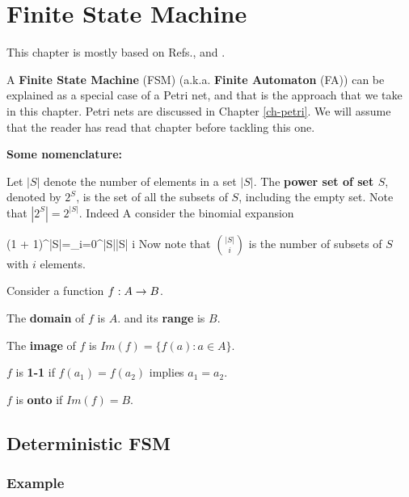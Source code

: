 \chapter{Finite State Machine}
\label{ch-finite-state}

This chapter is mostly based on Refs.\cite{fsm-brilliant}, \cite{wiki-det-automaton} and
\cite{wiki-nondet-automaton}.

A {\bf Finite State Machine} (FSM) (a.k.a. {\bf Finite Automaton} (FA))  can be explained as a 
special case of a Petri net, and that
is the approach that we take in this chapter.
Petri nets are discussed in Chapter \ref{ch-petri}. We will assume
that the reader has read that chapter before tackling this one.

{\bf Some nomenclature:}

Let $|S|$ denote the number of elements
in a set $|S|$.
The {\bf power set of set $S$}, denoted by $2^S$,
is the set of all the subsets of $S$, including the empty set.
Note that $|2^S|=2^{|S|}$. Indeed
A consider the binomial expansion

\beq
(1 + 1)^{|S|}=\sum_{i=0}^{|S|}{|S| \choose i}
\eeq
Now note that  ${|S|\choose i}$
is the number of subsets of $S$ with $i$ elements.

Consider a function
$f:A\rightarrow B$. 

The {\bf domain} of $f$ is $A$.
and its {\bf range} is $B$.

The {\bf image} of $f$
is $Im(f)=\{f(a): a\in A\}$. 

$f$ is {\bf 1-1} if $f(a_1)=f(a_2)$
implies $a_1=a_2$.


$f$ is {\bf onto} if $Im(f)=B$.

\section{Deterministic FSM}

\subsection{Example}

